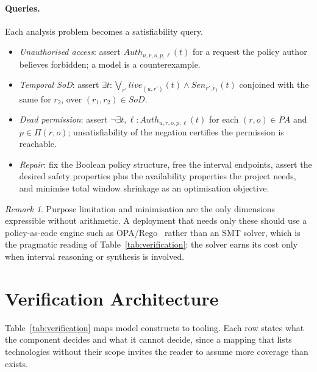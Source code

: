 \documentclass[11pt]{article}
\theoremstyle{definition}
\theoremstyle{plain}
\theoremstyle{remark}
\newtheorem{remark}{Remark}
\newcommand{\Auth}{\mathit{Auth}}
\newcommand{\SoD}{\mathit{SoD}}
\begin{document}
\paragraph{Queries.} Each analysis problem becomes a satisfiability query.
\begin{itemize}
  \item \emph{Unauthorised access}: assert $\Auth_{u,r,o,p,\ell}(t)$ for a
        request the policy author believes forbidden; a model is a
        counterexample.
  \item \emph{Temporal SoD}: assert
        $\exists t: \bigvee_{r'} \mathit{live}_{(u,r')}(t) \land
        \mathit{Sen}_{r',r_1}(t)$ conjoined with the same for $r_2$, over
        $(r_1,r_2) \in \SoD$.
  \item \emph{Dead permission}: assert
        $\neg \exists t,\ell : \Auth_{u,r,o,p,\ell}(t)$ for each
        $(r,o) \in PA$ and $p \in \Pi(r,o)$; unsatisfiability of the negation
        certifies the permission is reachable.
  \item \emph{Repair}: fix the Boolean policy structure, free the interval
        endpoints, assert the desired safety properties plus the availability
        properties the project needs, and minimise total window shrinkage as an
        optimisation objective.
\end{itemize}

\begin{remark}
Purpose limitation and minimisation are the only dimensions expressible without
arithmetic. A deployment that needs only these should use a
policy-as-code engine such as OPA/Rego~\citep{opa} rather than an SMT solver,
which is the pragmatic reading of Table~\ref{tab:verification}: the solver earns
its cost only when interval reasoning or synthesis is involved.
\end{remark}

\section{Verification Architecture}
\label{sec:architecture}

Table~\ref{tab:verification} maps model constructs to tooling. Each row states
what the component decides and what it cannot decide, since a mapping that
lists technologies without their scope invites the reader to assume more
coverage than exists.
\end{document}
